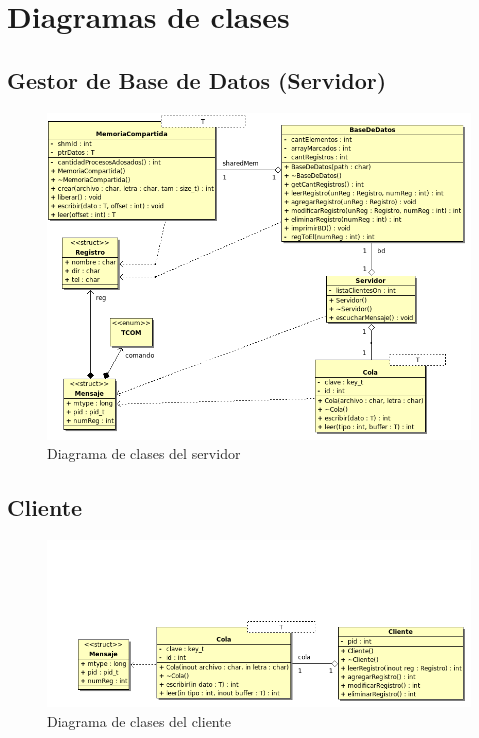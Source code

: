 \documentclass[a4paper,10pt]{article}
\begin{document}
\section{Diagramas de clases}
\subsection{Gestor de Base de Datos (Servidor)}
\begin{figure}[!htpb]
    \centering
    \includegraphics[width=12cm]{server.png}
    \caption{Diagrama de clases del servidor}
\end{figure}

\newpage
\subsection{Cliente}
			
\begin{figure}[!htpb]
    \centering
    \includegraphics[width=12cm]{cliente.png}
    \caption{Diagrama de clases del cliente}
\end{figure}		
		
		

				
\end{document}
